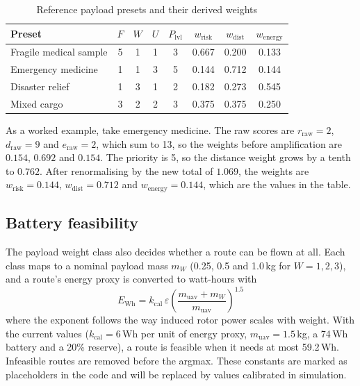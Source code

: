 \begin{table}[!htbp]
\centering
\caption{Reference payload presets and their derived weights}\label{tab:presets}
\small
\begin{tabular}{|l|c|c|c|c|c|c|c|}
\hline
\textbf{Preset} & $F$ & $W$ & $U$ & $P_\mathrm{lvl}$ & $w_\mathrm{risk}$ & $w_\mathrm{dist}$ & $w_\mathrm{energy}$\\
\hline
Fragile medical sample & 5 & 1 & 1 & 3 & 0.667 & 0.200 & 0.133\\
\hline
Emergency medicine & 1 & 1 & 3 & 5 & 0.144 & 0.712 & 0.144\\
\hline
Disaster relief & 1 & 3 & 1 & 2 & 0.182 & 0.273 & 0.545\\
\hline
Mixed cargo & 3 & 2 & 2 & 3 & 0.375 & 0.375 & 0.250\\
\hline
\end{tabular}
\end{table}

As a worked example, take emergency medicine. The raw scores are $r_\mathrm{raw} = 2$,
$d_\mathrm{raw} = 9$ and $e_\mathrm{raw} = 2$, which sum to 13, so the weights before
amplification are $0.154$, $0.692$ and $0.154$. The priority is 5, so the distance
weight grows by a tenth to $0.762$. After renormalising by the new total of $1.069$, the
weights are $w_\mathrm{risk} = 0.144$, $w_\mathrm{dist} = 0.712$ and
$w_\mathrm{energy} = 0.144$, which are the values in the table.

\subsection{Battery feasibility}

The payload weight class also decides whether a route can be flown at all. Each class
maps to a nominal payload mass $m_W$ (0.25, 0.5 and 1.0\,kg for $W = 1, 2, 3$), and a
route's energy proxy is converted to watt-hours with
\begin{equation}
  E_\mathrm{Wh} = k_\mathrm{cal}\,\varepsilon\left(\frac{m_\mathrm{uav} + m_W}{m_\mathrm{uav}}\right)^{1.5} \label{eq:battery}
\end{equation}
where the exponent follows the way induced rotor power scales with weight. With the
current values ($k_\mathrm{cal} = 6$\,Wh per unit of energy proxy,
$m_\mathrm{uav} = 1.5$\,kg, a 74\,Wh battery and a 20\% reserve), a route is feasible
when it needs at most 59.2\,Wh. Infeasible routes are removed before the argmax. These
constants are marked as placeholders in the code and will be replaced by values
calibrated in simulation.

